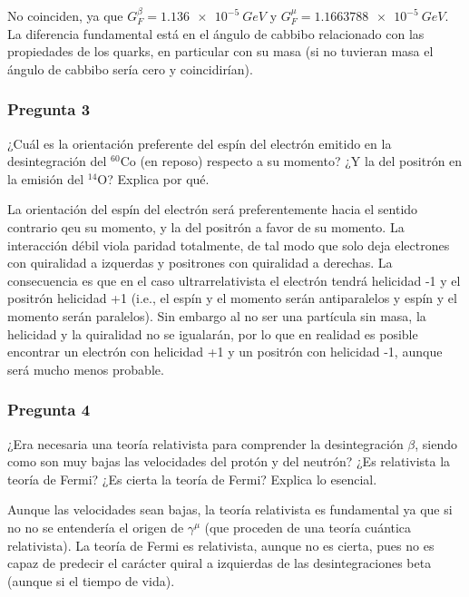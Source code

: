 No coinciden, ya que $G_F^\beta = \SI{1.136e-5}{GeV}$ y $G_F^\mu = \SI{1.1663788e-5}{GeV}$. La diferencia fundamental está en el ángulo de cabbibo relacionado con las propiedades de los quarks, en particular con su masa (si no tuvieran masa el ángulo de cabbibo sería cero y coincidirían). 

\vspace*{2em}

\begin{Enunciado}
	\subsubsection*{Pregunta 3}

	¿Cuál es la orientación preferente del espín del electrón emitido en la desintegración del $^{60}$Co (en reposo) respecto a su momento? ¿Y la del positrón en la emisión del $^{14}$O? Explica por qué.

\end{Enunciado}

La orientación del espín del electrón será preferentemente hacia el sentido contrario qeu su momento, y la del positrón a favor de su momento. La interacción débil viola paridad totalmente, de tal modo que solo deja electrones con quiralidad a izquerdas y positrones con quiralidad a derechas. La consecuencia es que en el caso ultrarrelativista el electrón tendrá helicidad -1 y el positrón helicidad +1 (i.e., el espín y el momento serán antiparalelos y espín y el momento serán paralelos). Sin embargo al no ser una partícula sin masa, la helicidad y la quiralidad no se igualarán, por lo que en realidad es posible encontrar un electrón con helicidad +1 y un positrón con helicidad -1, aunque será mucho menos probable. 

\vspace*{2em}

\begin{Enunciado}
	\subsubsection*{Pregunta 4}

	¿Era necesaria una teoría relativista para comprender la desintegración $\beta$, siendo como son muy bajas las velocidades del protón y del neutrón? ¿Es relativista la teoría de Fermi? ¿Es cierta la teoría de Fermi? Explica lo esencial.

\end{Enunciado}

Aunque las velocidades sean bajas, la teoría relativista es fundamental ya que si no no se entendería el origen de $\gamma^\mu$ (que proceden de una teoría cuántica relativista). La teoría de Fermi es relativista, aunque no es cierta, pues no es capaz de predecir el carácter quiral a izquierdas de las desintegraciones beta (aunque si el tiempo de vida). 

